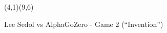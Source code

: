 \documentclass{article}
\begin{document}
\begin{figure}[!thbp]
  \setgounit{0.7cm}

  \begin{center}
    \begin{psgoboard*}[19]
    \end{psgoboard*}
    \caption{Lee Sedol vs AlphaGoZero - Game 2 (“Invention”)}\label{Figure:LS-vs-AG-Game2}
  \end{center}
  
  \begin{psgopartialboard}[9]{(4,1)(9,6)}
  \end{psgopartialboard}
\end{figure}
\end{document}
